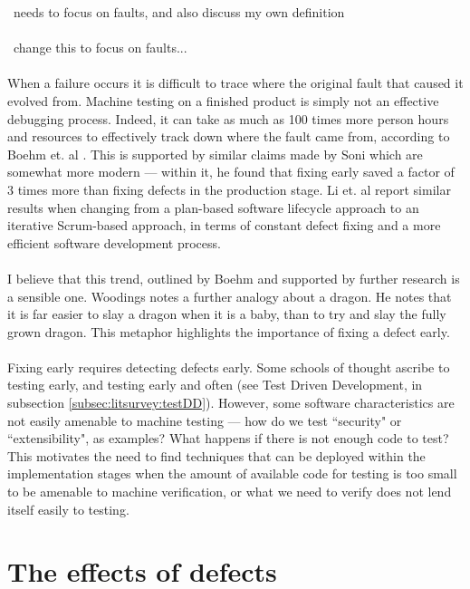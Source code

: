 \FIXME\ needs to focus on faults, and also discuss my own definition\\
\\
\FIXME\ change this to focus on faults...\\
\\
When a failure occurs it is difficult to trace where the original fault that caused it evolved from.
Machine testing on a finished product is simply not an effective debugging process.
Indeed, it can take as much as 100 times more person hours and resources to effectively track down
where the fault came from, according to Boehm et. al \cite{boehm2005foundations}.
This is supported by similar claims made by Soni \cite{soni2006defect} which are somewhat more
modern --- within it, he found that fixing early saved a factor of 3 times more than fixing defects
in the production stage.
Li et. al \cite{li2010transition} report similar results when changing from a plan-based software
lifecycle approach to an iterative Scrum-based approach, in terms of constant defect fixing and a
more efficient software development process.\\
\\
I believe that this trend, outlined by Boehm and supported by further research is a sensible one.
Woodings \cite{terryLecture4220} notes a further analogy about a dragon.
He notes that it is far easier to slay a dragon when it is a baby, than to try and slay the fully
grown dragon.
This metaphor highlights the importance of fixing a defect early.\\
\\
Fixing early requires detecting defects early.
Some schools of thought ascribe to testing early, and testing early and often (see Test Driven Development, in
subsection \ref{subsec:litsurvey:testDD}).
However, some software characteristics are not easily amenable to machine testing --- how do we test
``security" or ``extensibility", as examples?
What happens if there is not enough code to test?
This motivates the need to find techniques that can be deployed within the implementation stages
when the amount of available code for testing is too small to be amenable to machine verification,
or what we need to verify does not lend itself easily to testing.

\section{The effects of defects} \label{sec:litsurvey:defEffects}

